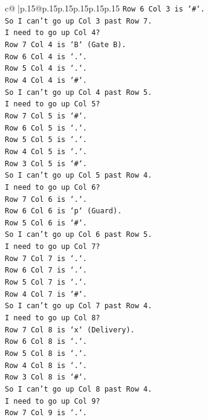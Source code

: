\documentclass{article}
\begin{document}
{\begin{supertabular}{c@{$\;$}|p{.15\linewidth}@{}p{.15\linewidth}p{.15\linewidth}p{.15\linewidth}p{.15\linewidth}p{.15\linewidth}}
{{{\texttt{Row 6 Col 3 is `\#`.} \\
\texttt{So I can't go up Col 3 past Row 7.} \\
\texttt{I need to go up Col 4?} \\
\texttt{Row 7 Col 4 is `B` (Gate B).} \\
\texttt{Row 6 Col 4 is `.`.} \\
\texttt{Row 5 Col 4 is `.`.} \\
\texttt{Row 4 Col 4 is `\#`.} \\
\texttt{So I can't go up Col 4 past Row 5.} \\
\texttt{I need to go up Col 5?} \\
\texttt{Row 7 Col 5 is `\#`.} \\
\texttt{Row 6 Col 5 is `.`.} \\
\texttt{Row 5 Col 5 is `.`.} \\
\texttt{Row 4 Col 5 is `.`.} \\
\texttt{Row 3 Col 5 is `\#`.} \\
\texttt{So I can't go up Col 5 past Row 4.} \\
\texttt{I need to go up Col 6?} \\
\texttt{Row 7 Col 6 is `.`.} \\
\texttt{Row 6 Col 6 is `p` (Guard).} \\
\texttt{Row 5 Col 6 is `\#`.} \\
\texttt{So I can't go up Col 6 past Row 5.} \\
\texttt{I need to go up Col 7?} \\
\texttt{Row 7 Col 7 is `.`.} \\
\texttt{Row 6 Col 7 is `.`.} \\
\texttt{Row 5 Col 7 is `.`.} \\
\texttt{Row 4 Col 7 is `\#`.} \\
\texttt{So I can't go up Col 7 past Row 4.} \\
\texttt{I need to go up Col 8?} \\
\texttt{Row 7 Col 8 is `x` (Delivery).} \\
\texttt{Row 6 Col 8 is `.`.} \\
\texttt{Row 5 Col 8 is `.`.} \\
\texttt{Row 4 Col 8 is `.`.} \\
\texttt{Row 3 Col 8 is `\#`.} \\
\texttt{So I can't go up Col 8 past Row 4.} \\
\texttt{I need to go up Col 9?} \\
\texttt{Row 7 Col 9 is `.`.} \\
}}}
\end{supertabular}}
\end{document}
